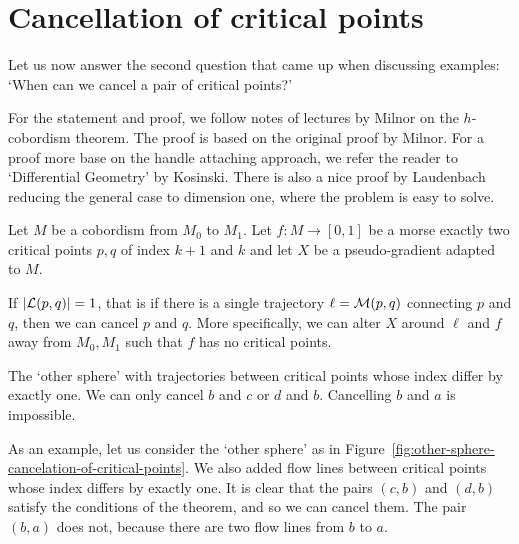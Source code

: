\section{Cancellation of critical points}

Let us now answer the second question that came up when discussing examples: `When can we cancel a pair of critical points?'

For the statement and proof, we follow notes of lectures by Milnor on the $h$-cobordism theorem.
The proof is based on the original proof by Milnor.
For a proof more base on the handle attaching approach, we refer the reader to `Differential Geometry' by Kosinski.
There is also a nice proof by Laudenbach reducing the general case to dimension one, where the problem is easy to solve.

\begin{theorem}
    Let $M$ be a cobordism from $M_0$ to $M_1$.
    Let $f: M \to  [0,1]$ be a morse exactly two critical points $p, q$ of index  $k+1$ and  $k$ and let $X$ be a pseudo-gradient adapted to $M$.

    If $|\mathcal L(p, q)| = 1$, that is if there is a single trajectory $\ell = \mathcal M(p, q)$ connecting $p$ and  $q$, then we can cancel $p$ and  $q$.
    More specifically, we can alter $X$ around  $\ell$ and $f$ away from  $M_0, M_1$ such that $f$ has no critical points.
\end{theorem}
\begin{marginfigure}
    \centering
    \caption{The `other sphere' with trajectories between critical points whose index differ by exactly one. We can only cancel $b$ and $c$ or $d$ and $b$. Cancelling $b$ and $a$ is impossible.}
    \label{fig:other-sphere-cancelation-of-critical-points}
\end{marginfigure}
\begin{eg}
    As an example, let us consider the `other sphere' as in Figure~\ref{fig:other-sphere-cancelation-of-critical-points}.
   We also added flow lines between critical points whose index differs by exactly one.
   It is clear that the pairs $(c,b)$ and $(d, b)$ satisfy the conditions of the theorem, and so we can cancel them.
   The pair $(b,a)$ does not, because there are two flow lines from $b$ to $a$.
\end{eg}

